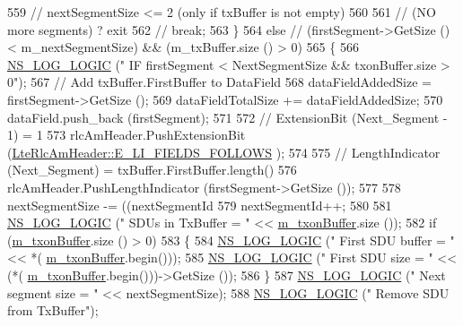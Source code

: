 \begin{DoxyCode}
559           \textcolor{comment}{// nextSegmentSize <= 2 (only if txBuffer is not empty)}
560 
561           \textcolor{comment}{// (NO more segments) ? exit}
562           \textcolor{comment}{// break;}
563         \}
564       \textcolor{keywordflow}{else} \textcolor{comment}{// (firstSegment->GetSize () < m\_nextSegmentSize) && (m\_txBuffer.size () > 0)}
565         \{
566           \hyperlink{group__logging_ga88acd260151caf2db9c0fc84997f45ce}{NS\_LOG\_LOGIC} (\textcolor{stringliteral}{"    IF firstSegment < NextSegmentSize && txonBuffer.size > 0"});
567           \textcolor{comment}{// Add txBuffer.FirstBuffer to DataField}
568           dataFieldAddedSize = firstSegment->GetSize ();
569           dataFieldTotalSize += dataFieldAddedSize;
570           dataField.push\_back (firstSegment);
571 
572           \textcolor{comment}{// ExtensionBit (Next\_Segment - 1) = 1}
573           rlcAmHeader.PushExtensionBit (\hyperlink{classns3_1_1LteRlcAmHeader_a516bc34a521085f22b455aeac9ebc364aef53e53d29f464e8cb34fd6fede4b18c}{LteRlcAmHeader::E\_LI\_FIELDS\_FOLLOWS}
      );
574 
575           \textcolor{comment}{// LengthIndicator (Next\_Segment)  = txBuffer.FirstBuffer.length()}
576           rlcAmHeader.PushLengthIndicator (firstSegment->GetSize ());
577 
578           nextSegmentSize -= ((nextSegmentId %
579           nextSegmentId++;
580 
581           \hyperlink{group__logging_ga88acd260151caf2db9c0fc84997f45ce}{NS\_LOG\_LOGIC} (\textcolor{stringliteral}{"        SDUs in TxBuffer  = "} << 
      \hyperlink{classns3_1_1LteRlcAm_ad8ba4549a7c78cfe0e528d2e9cc465f8}{m\_txonBuffer}.size ());
582           \textcolor{keywordflow}{if} (\hyperlink{classns3_1_1LteRlcAm_ad8ba4549a7c78cfe0e528d2e9cc465f8}{m\_txonBuffer}.size () > 0)
583             \{
584               \hyperlink{group__logging_ga88acd260151caf2db9c0fc84997f45ce}{NS\_LOG\_LOGIC} (\textcolor{stringliteral}{"        First SDU buffer  = "} << *(
      \hyperlink{classns3_1_1LteRlcAm_ad8ba4549a7c78cfe0e528d2e9cc465f8}{m\_txonBuffer}.begin()));
585               \hyperlink{group__logging_ga88acd260151caf2db9c0fc84997f45ce}{NS\_LOG\_LOGIC} (\textcolor{stringliteral}{"        First SDU size    = "} << (*(
      \hyperlink{classns3_1_1LteRlcAm_ad8ba4549a7c78cfe0e528d2e9cc465f8}{m\_txonBuffer}.begin()))->GetSize ());
586             \}
587           \hyperlink{group__logging_ga88acd260151caf2db9c0fc84997f45ce}{NS\_LOG\_LOGIC} (\textcolor{stringliteral}{"        Next segment size = "} << nextSegmentSize);
588           \hyperlink{group__logging_ga88acd260151caf2db9c0fc84997f45ce}{NS\_LOG\_LOGIC} (\textcolor{stringliteral}{"        Remove SDU from TxBuffer"});

\end{DoxyCode}
